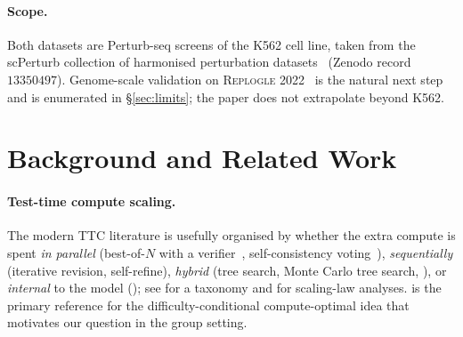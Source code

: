\documentclass[10pt,a4paper]{article}
\begin{document}
\paragraph{Scope.} Both datasets are Perturb-seq screens of the K562 cell line,
taken from the scPerturb collection of harmonised perturbation
datasets~\citep{peidli2024scperturb} (Zenodo record $13350497$). Genome-scale validation on
\textsc{Replogle 2022}~\citep{replogle2022perturbseq} is the natural next step
and is enumerated in \S\ref{sec:limits}; the paper does not extrapolate
beyond K562.

\section{Background and Related Work}\label{sec:related}

\paragraph{Test-time compute scaling.} The modern TTC literature is usefully
organised by whether the extra compute is spent \emph{in parallel} (best-of-$N$
with a verifier~\citep{cobbe2021verifiers,lightman2024prm}, self-consistency
voting~\citep{wang2023selfconsistency}), \emph{sequentially} (iterative
revision, self-refine), \emph{hybrid} (tree search, Monte Carlo tree search,
\citep{yao2023tot}), or \emph{internal} to the model
(\citep{deepseek2025r1,muennighoff2025s1}); see \citet{zhang2025ttssurvey} for
a taxonomy and \citet{wu2024smalltllm,liu2025rethinkingtts} for scaling-law
analyses. \citet{snell2024scaling} is the primary reference for the
difficulty-conditional compute-optimal idea that motivates our question in
the group setting.
\end{document}
